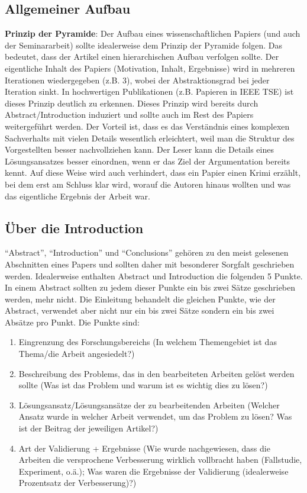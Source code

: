 \documentclass[runningheads,a4paper]{uwsese}
\begin{document}
\subsection{Allgemeiner Aufbau}

\textbf{Prinzip der Pyramide}: Der Aufbau eines wissenschaftlichen Papiers (und auch der Seminararbeit) sollte idealerweise dem Prinzip der Pyramide folgen. Das bedeutet, dass der Artikel einen hierarchischen Aufbau verfolgen sollte. Der eigentliche Inhalt des Papiers (Motivation, Inhalt, Ergebnisse) wird in mehreren Iterationen wiedergegeben (z.B. 3), wobei der Abstraktionsgrad bei jeder Iteration sinkt. In hochwertigen Publikationen (z.B. Papieren in IEEE TSE) ist dieses Prinzip deutlich zu erkennen. Dieses Prinzip wird bereits durch Abstract/Introduction induziert und sollte auch im Rest des Papiers weitergeführt werden. Der Vorteil ist, dass es das Verständnis eines komplexen Sachverhalts mit vielen Details wesentlich erleichtert, weil man die Struktur des Vorgestellten besser nachvollziehen kann. Der Leser kann die Details eines Lösungsansatzes besser einordnen, wenn er das Ziel der Argumentation bereits kennt. Auf diese Weise wird auch verhindert, dass ein Papier einen Krimi erzählt, bei dem erst am Schluss klar wird, worauf die Autoren hinaus wollten und was das eigentliche Ergebnis der Arbeit war.

\subsection{Über die Introduction}
\label{sub:intro}

``Abstract'', ``Introduction'' und ``Conclusions'' gehören zu den meist gelesenen Abschnitten eines Papers und sollten daher mit besonderer Sorgfalt geschrieben werden. Idealerweise enthalten Abstract und Introduction die folgenden 5 Punkte. In einem Abstract sollten zu jedem dieser Punkte ein bis zwei Sätze geschrieben werden, mehr nicht. Die Einleitung behandelt die gleichen Punkte, wie der Abstract, verwendet aber nicht nur ein bis zwei Sätze sondern ein bis zwei Absätze pro Punkt. Die Punkte sind:

\begin{enumerate}
	\item Eingrenzung des Forschungsbereichs (In welchem Themengebiet ist das Thema/die Arbeit angesiedelt?)
	\item Beschreibung des Problems, das in den bearbeiteten Arbeiten gelöst werden sollte (Was ist das Problem und warum ist es wichtig dies zu lösen?)
	\item Lösungsansatz/Lösungsansätze der zu bearbeitenden Arbeiten (Welcher Ansatz wurde in welcher Arbeit verwendet, um das Problem zu lösen? Was ist der Beitrag der jeweiligen Artikel?)
	\item Art der Validierung + Ergebnisse (Wie wurde nachgewiesen, dass die Arbeiten die versprochene Verbesserung wirklich vollbracht haben (Fallstudie, Experiment, o.ä.); Was waren die Ergebnisse der Validierung (idealerweise Prozentsatz der Verbesserung)?)
\end{enumerate}
\end{document}
